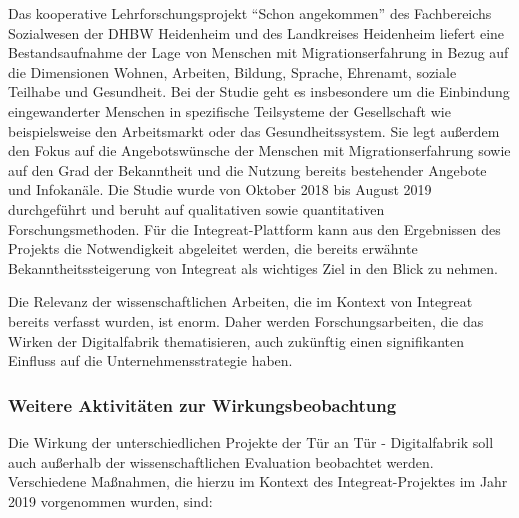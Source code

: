 \documentclass[12pt, a4paper]{article} %
\begin{document}
Das kooperative Lehrforschungsprojekt “Schon angekommen” des
Fachbereichs Sozialwesen der DHBW Heidenheim und des Landkreises
Heidenheim liefert eine Bestandsaufnahme der Lage von Menschen mit
Migrationserfahrung in Bezug auf die Dimensionen Wohnen, Arbeiten,
Bildung, Sprache, Ehrenamt, soziale Teilhabe und Gesundheit. Bei der
Studie geht es insbesondere um die Einbindung eingewanderter Menschen in
spezifische Teilsysteme der Gesellschaft wie beispielsweise den
Arbeitsmarkt oder das Gesundheitssystem. Sie legt außerdem den Fokus auf
die Angebotswünsche der Menschen mit Migrationserfahrung sowie auf den
Grad der Bekanntheit und die Nutzung bereits bestehender Angebote und
Infokanäle. Die Studie wurde von Oktober 2018 bis August 2019
durchgeführt und beruht auf qualitativen sowie quantitativen
Forschungsmethoden. Für die Integreat-Plattform kann aus den Ergebnissen
des Projekts die Notwendigkeit abgeleitet werden, die bereits erwähnte
Bekanntheitssteigerung von Integreat als wichtiges Ziel in den Blick zu
nehmen.

Die Relevanz der wissenschaftlichen Arbeiten, die im Kontext von
Integreat bereits verfasst wurden, ist enorm. Daher werden
Forschungsarbeiten, die das Wirken der Digitalfabrik thematisieren, auch
zukünftig einen signifikanten Einfluss auf die Unternehmensstrategie
haben.

\hypertarget{weitere-aktivituxe4ten-zur-wirkungsbeobachtung}{%
\subsubsection{Weitere Aktivitäten zur
Wirkungsbeobachtung}\label{weitere-aktivituxe4ten-zur-wirkungsbeobachtung}}

Die Wirkung der unterschiedlichen Projekte der Tür an Tür -
Digitalfabrik soll auch außerhalb der wissenschaftlichen Evaluation
beobachtet werden. Verschiedene Maßnahmen, die hierzu im Kontext des
Integreat-Projektes im Jahr 2019 vorgenommen wurden, sind:
\end{document}
